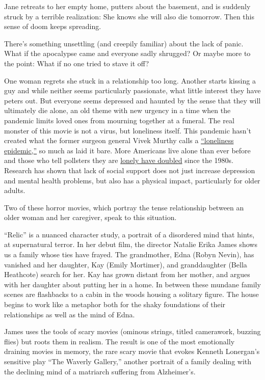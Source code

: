 Jane retreats to her empty home, putters about the basement, and is
suddenly struck by a terrible realization: She knows she will also die
tomorrow. Then this sense of doom keeps spreading.

There's something unsettling (and creepily familiar) about the lack of
panic. What if the apocalypse came and everyone sadly shrugged? Or maybe
more to the point: What if no one tried to stave it off?

One woman regrets she stuck in a relationship too long. Another starts
kissing a guy and while neither seems particularly passionate, what
little interest they have peters out. But everyone seems depressed and
haunted by the sense that they will ultimately die alone, an old theme
with new urgency in a time when the pandemic limits loved ones from
mourning together at a funeral. The real monster of this movie is not a
virus, but loneliness itself. This pandemic hasn't created what the
former surgeon general Vivek Murthy calls a
\href{https://www.wbur.org/onpoint/2020/03/23/vivek-murthy-loneliness}{``loneliness
epidemic,''} so much as laid it bare. More Americans live alone than
ever before and those who tell pollsters they are
\href{https://www.rollingstone.com/culture/culture-features/coronavirus-isolation-negative-effects-health-loneliness-1016478/}{lonely
have doubled} since the 1980s. Research has shown that lack of social
support does not just increase depression and mental health problems,
but also has a physical impact, particularly for older adults.

Two of these horror movies, which portray the tense relationship between
an older woman and her caregiver, speak to this situation.

``Relic'' is a nuanced character study, a portrait of a disordered mind
that hints, at supernatural terror. In her debut film, the director
Natalie Erika James shows us a family whose ties have frayed. The
grandmother, Edna (Robyn Nevin), has vanished and her daughter, Kay
(Emily Mortimer), and granddaughter (Bella Heathcote) search for her.
Kay has grown distant from her mother, and argues with her daughter
about putting her in a home. In between these mundane family scenes are
flashbacks to a cabin in the woods housing a solitary figure. The house
begins to work like a metaphor both for the shaky foundations of their
relationships as well as the mind of Edna.

James uses the tools of scary movies (ominous strings, titled
camerawork, buzzing flies) but roots them in realism. The result is one
of the most emotionally draining movies in memory, the rare scary movie
that evokes Kenneth Lonergan's sensitive play ``The Waverly Gallery,''
another portrait of a family dealing with the declining mind of a
matriarch suffering from Alzheimer's.

